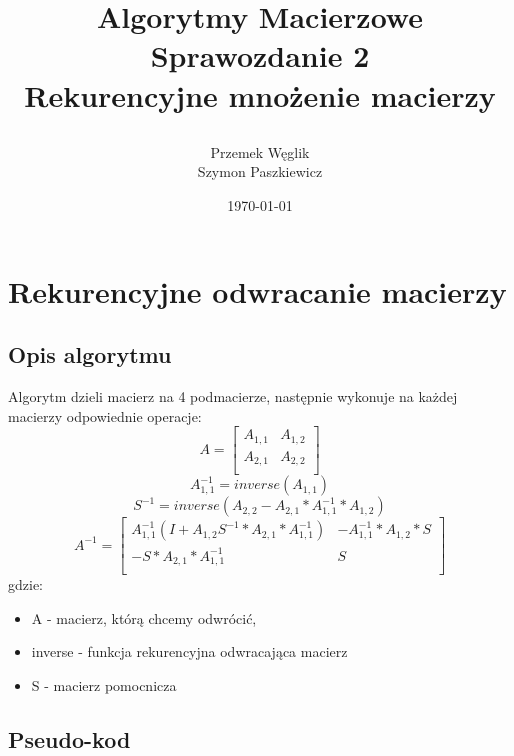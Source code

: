 \documentclass{article}
\title {
        Algorytmy Macierzowe \\
        Sprawozdanie 2 \\
        Rekurencyjne mnożenie macierzy

}
\author{Przemek Węglik \\ Szymon Paszkiewicz}
\date{\today}
\begin{document}
\maketitle

\tableofcontents

\newpage

\section{Rekurencyjne odwracanie macierzy}

\subsection{Opis algorytmu}
\qquad Algorytm dzieli macierz na 4 podmacierze, następnie wykonuje na każdej macierzy odpowiednie operacje:
\begin{equation}
A = 
     \begin{bmatrix}
      A_{1,1} & A_{1,2}  \\
      A_{2,1} & A_{2,2} \\
     \end{bmatrix}
\end{equation}
\begin{equation}
A_{1,1}^{-1} = inverse(A_{1,1})
\end{equation}
\begin{equation}
S^{-1} = inverse(A_{2,2} - A_{2,1} * A_{1,1}^{-1} * A_{1,2})
\end{equation}
\begin{equation}
A^{-1} =      
\begin{bmatrix}
      A_{1,1}^{-1}(I + A_{1,2}S^{-1} * A_{2,1} * A_{1,1}^{-1}) &
      -A_{1,1}^{-1} * A_{1,2} * S  \\
      -S * A_{2,1} * A_{1,1}^{-1} & S \\
    \end{bmatrix}
\end{equation}
gdzie:
\begin{itemize}
    \item[] A - macierz, którą chcemy odwrócić,
    \item[] inverse - funkcja rekurencyjna odwracająca macierz
    \item[] S - macierz pomocnicza
    
\end{itemize}

\subsection{Pseudo-kod}
\end{document}
